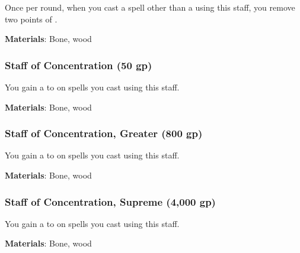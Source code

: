 Once per round, when you cast a spell other than a  using this staff,
you remove two points of .



\vspace{0.25em}
\textbf{Materials}: Bone, wood


\lowercase{\hypertarget{item:Staff of Concentration}{}}\label{item:Staff of Concentration}
\hypertarget{item:Staff of Concentration}{\subsubsection{Staff of Concentration\hfill{} (50 gp)}}

You gain a   to  on spells you cast using this staff.



\vspace{0.25em}
\textbf{Materials}: Bone, wood


\lowercase{\hypertarget{item:Staff of Concentration, Greater}{}}\label{item:Staff of Concentration, Greater}
\hypertarget{item:Staff of Concentration, Greater}{\subsubsection{Staff of Concentration, Greater\hfill{} (800 gp)}}

You gain a   to  on spells you cast using this staff.



\vspace{0.25em}
\textbf{Materials}: Bone, wood


\lowercase{\hypertarget{item:Staff of Concentration, Supreme}{}}\label{item:Staff of Concentration, Supreme}
\hypertarget{item:Staff of Concentration, Supreme}{\subsubsection{Staff of Concentration, Supreme\hfill{} (4,000 gp)}}

You gain a   to  on spells you cast using this staff.



\vspace{0.25em}
\textbf{Materials}: Bone, wood


